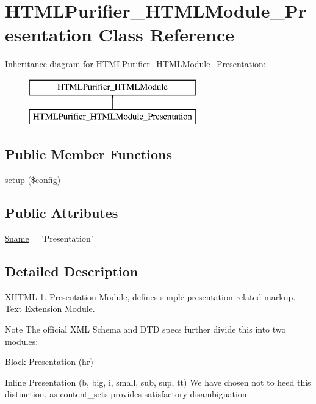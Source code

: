 \hypertarget{classHTMLPurifier__HTMLModule__Presentation}{\section{H\+T\+M\+L\+Purifier\+\_\+\+H\+T\+M\+L\+Module\+\_\+\+Presentation Class Reference}
\label{classHTMLPurifier__HTMLModule__Presentation}
}
Inheritance diagram for H\+T\+M\+L\+Purifier\+\_\+\+H\+T\+M\+L\+Module\+\_\+\+Presentation\+:\begin{figure}[H]
\begin{center}
\leavevmode
\includegraphics[height=2.000000cm]{classHTMLPurifier__HTMLModule__Presentation}
\end{center}
\end{figure}
\subsection*{Public Member Functions}
\begin{DoxyCompactItemize}
\item 
\hyperlink{classHTMLPurifier__HTMLModule__Presentation_aad486d68ab48bb92c282dba0544dfda1}{setup} (\$config)
\end{DoxyCompactItemize}
\subsection*{Public Attributes}
\begin{DoxyCompactItemize}
\item 
\hyperlink{classHTMLPurifier__HTMLModule__Presentation_a40a8ba1db0e8f2b3b2cc8d6fe7c01ef4}{\$name} = 'Presentation'
\end{DoxyCompactItemize}


\subsection{Detailed Description}
X\+H\+T\+M\+L 1. Presentation Module, defines simple presentation-\/related markup. Text Extension Module. \begin{DoxyNote}{Note}
The official X\+M\+L Schema and D\+T\+D specs further divide this into two modules\+:
\begin{DoxyItemize}
\item Block Presentation (hr)
\item Inline Presentation (b, big, i, small, sub, sup, tt) We have chosen not to heed this distinction, as content\+\_\+sets provides satisfactory disambiguation. 
\end{DoxyItemize}
\end{DoxyNote}


